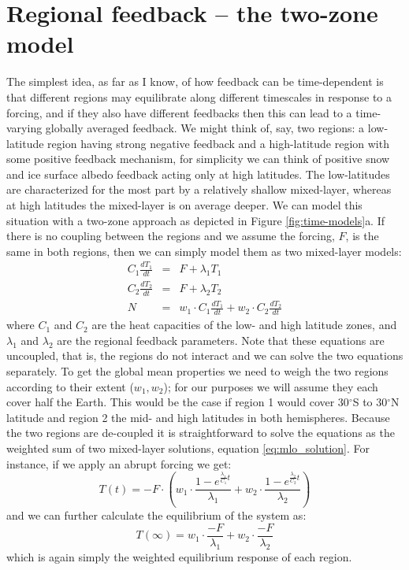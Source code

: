\documentclass[12pt]{book}
\begin{document}
\section{Regional feedback -- the two-zone model}
The simplest idea, as far as I know, of how feedback can be time-dependent is that different regions may equilibrate along different timescales in response to a forcing, and if they also have different feedbacks then this can lead to a time-varying globally averaged feedback. 
We might think of, say, two regions: a low-latitude region having strong negative feedback and a high-latitude region with some positive feedback mechanism, for simplicity we can think of positive snow and ice surface albedo feedback acting only at high latitudes. The low-latitudes are characterized for the most part by a relatively shallow mixed-layer, whereas at high latitudes the mixed-layer is on average deeper. 
We can model this situation with a two-zone approach as depicted in Figure \ref{fig:time-models}a. 
If there is no coupling between the regions and we assume the forcing, $F$, is the same in both regions, then we can simply model them as two mixed-layer models:
\begin{eqnarray}
C_1\frac{dT_1}{dt} &=& F + \lambda_1 T_1 \label{eq:twozone_simple} \\
C_2\frac{dT_2}{dt} &=& F + \lambda_2 T_2 \nonumber \\
N &=& w_1\cdot C_1\frac{dT_1}{dt}+w_2\cdot C_2\frac{dT_2}{dt}  \nonumber
\end{eqnarray}
where $C_1$ and $C_2$ are the heat capacities of the low- and high latitude zones, and $\lambda_1$ and $\lambda_2$ are the regional feedback parameters. Note that these equations are uncoupled, that is, the regions do not interact and we can solve the two equations separately. To get the global mean properties we need to weigh the two regions according to their extent ($w_1, w_2$); for our purposes we will assume they each cover half the Earth. This would be the case if region 1 would cover 30$^\circ$S to 30$^\circ$N latitude and region 2 the mid- and high latitudes in both hemispheres.
Because the two regions are de-coupled it is straightforward to solve the equations as the weighted sum of two mixed-layer solutions, equation \ref{eq:mlo_solution}. For instance, if we apply an abrupt forcing we get:
\begin{equation}
T(t) = -F\cdot  \left( w_1\cdot\frac{1-e^{\frac{\lambda_1}{C_1}t}}{\lambda_1} + w_2\cdot \frac{1-e^{\frac{\lambda_2}{C_2}t}}{\lambda_2} \right)
\label{eq:twozone-solution}
\end{equation}
and we can further calculate the equilibrium of the system as:
$$T(\infty) = w_1\cdot\frac{-F}{\lambda_1} +  w_2\cdot\frac{-F}{\lambda_2} $$
which is again simply the weighted equilibrium response of each region.
\end{document}
